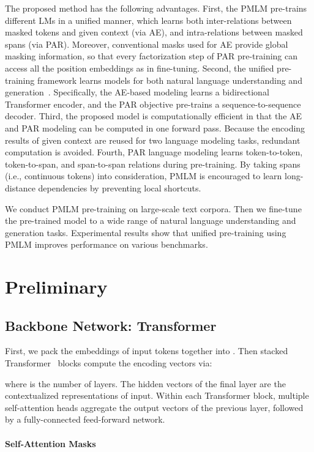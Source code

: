 \documentclass{article}
\newcommand\pmlm{\textsc{PMLM}}
\begin{document}
The proposed method has the following advantages.
First, the \pmlm{} pre-trains different LMs in a unified manner, which learns both inter-relations between masked tokens and given context (via AE), and intra-relations between masked spans (via PAR).
Moreover, conventional masks used for AE provide global masking information, so that every factorization step of PAR pre-training can access all the position embeddings as in fine-tuning.
Second, the unified pre-training framework learns models for both natural language understanding and generation~\cite{unilm}.
Specifically, the AE-based modeling learns a bidirectional Transformer encoder, and the PAR objective pre-trains a sequence-to-sequence decoder.
Third, the proposed model is computationally efficient in that the AE and PAR modeling can be computed in one forward pass.
Because the encoding results of given context are reused for two language modeling tasks, redundant computation is avoided.
Fourth, PAR language modeling learns token-to-token, token-to-span, and span-to-span relations during pre-training.
By taking spans (i.e., continuous tokens) into consideration, \pmlm{} is encouraged to learn long-distance dependencies by preventing local shortcuts.

We conduct \pmlm{} pre-training on large-scale text corpora.
Then we fine-tune the pre-trained model to a wide range of natural language understanding and generation tasks.
Experimental results show that unified pre-training using \pmlm{} improves performance on various benchmarks.


\section{Preliminary}

\subsection{Backbone Network: Transformer}
\label{sec:transformer}

First, we pack the embeddings of input tokens  together into .
Then  stacked Transformer~\cite{transformer} blocks compute the encoding vectors via:

where  is the number of layers.
The hidden vectors of the final layer  are the contextualized representations of input.
Within each Transformer block, multiple self-attention heads aggregate the output vectors of the previous layer, followed by a fully-connected feed-forward network.

\paragraph{Self-Attention Masks}
\end{document}
